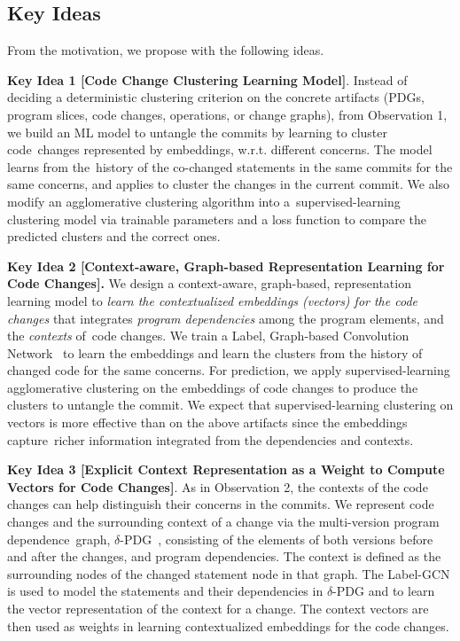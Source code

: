 \subsection{Key Ideas}
\label{ideas:sec}

From the motivation, we propose {\tool} with the following
ideas.


{\bf Key Idea 1 [Code Change Clustering Learning Model]}. Instead of
deciding a deterministic clustering criterion on the concrete
artifacts (PDGs, program slices, code changes, operations, or change
graphs), from Observation 1, we build an ML model to untangle the
commits by learning to cluster code~changes represented by embeddings,
w.r.t. different concerns. The model learns from the~history of the
co-changed statements in the same commits for the same concerns, and
applies to cluster the changes in the current commit.  We also modify
an agglomerative clustering algorithm into a~super\-vised-learning
clustering model via trainable parameters and a loss function to
compare the predicted clusters and the correct ones.

{\bf Key Idea 2 [Context-aware, Graph-based Representation Learning
    for Code Changes].} We design a context-aware, graph-based,
representation learning model to {\em learn the contextualized
  embeddings (vectors) for the code changes} that integrates {\em
  program dependencies} among the program elements, and the {\em
  contexts} of~code changes. We train a Label, Graph-based Convolution
Network~\cite{label-gcn} to learn the embeddings and learn the
clusters from the history of changed code for the same concerns.
For prediction, we apply supervised-learning agglomerative
clustering on the embeddings of code changes to produce the clusters
to untangle the commit. We expect that supervised-learning clustering
on vectors is more effective than on the above artifacts since the
embeddings capture~richer information integrated from the
dependencies and contexts.


{\bf Key Idea 3 [Explicit Context Representation as a Weight to
    Compute Vectors for Code Changes]}. As in Observation 2, the
contexts of the code changes can help distinguish their concerns in
the commits. We represent code changes and the surrounding context of
a change via the multi-version program dependence~graph,
$\delta$-PDG~\cite{flexeme-fse20}, consisting of the elements of both
versions before and after the changes, and program dependencies. The
context is defined as the surrounding nodes of the changed statement
node in that graph. The Label-GCN is used to model the statements and their
dependencies in $\delta$-PDG and to learn the vector
representation of the context for a change. The context vectors are
then used as weights in learning contextualized embeddings for the
code changes.

